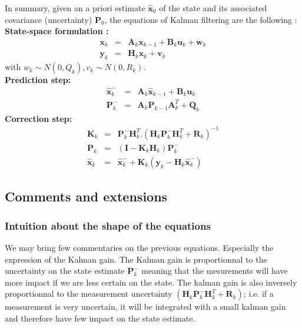 \documentclass[10pt,oneside]{scrartcl}
\newcommand\vecteur[1]{\boldsymbol#1}
\newcommand\matrice[1]{\mathbf#1}
\begin{document}
In summary, given an a priori estimate $\hat{\vecteur{x}}_0$ of the state and its associated covariance (uncertainty) $\matrice{P}_0$, the equations of Kalman filtering are the following :\\
\textbf{State-space formulation :}\\
\begin{eqnarray}
\vecteur{x_k} &=& \matrice{A}_k \vecteur{x}_{k-1} + \matrice{B}_k
\vecteur{u}_k + \vecteur{w}_{k}\\
\vecteur{y_k} &=& \matrice{H}_k \vecteur{x_k} + \vecteur{v_k}
\end{eqnarray}
with $w_k\sim N(0,Q_k), v_k \sim N(0,R_k)$.\\
\textbf{Prediction step:}\\
\begin{eqnarray}
\hat{\vecteur{x}}^-_k &=& \matrice{A}_k \hat{\vecteur{x}}_{k-1} + \matrice{B}_k
\vecteur{u}_k \\
\matrice{P^-_k} &=& \matrice{A}_k \matrice{P_{k-1}} \matrice{A}_k^T + \matrice{Q_k}
\end{eqnarray}
\textbf{Correction step:}\\
\begin{eqnarray}
\matrice{K_k} &=& \matrice{P^-_k} \matrice{H}_k^T . (\matrice{H}_k \matrice{P^-_k} \matrice{H}_k^T +\matrice{R_k})^{-1}\\
\matrice{P_k} &=& (\matrice{I} - \matrice{K_k} \matrice{H}_k) \matrice{P^-_k}\\
\hat{\vecteur{x}}_k &=& \hat{\vecteur{x}}^-_k + \matrice{K_k} (\vecteur{y_k} - \matrice{H}_k \hat{\vecteur{x}}_k^-)
\end{eqnarray}

\subsection{Comments and extensions}

\subsubsection{Intuition about the shape of the equations}

We may bring few commentaries on the previous equations. Especially
the expression of the Kalman gain. The Kalman gain is proportionnal to
the uncertainty on the state estimate $\matrice{P}_k^-$ meaning that
the mesurements will have more impact if we are less certain on the
state. The kalman gain is also inversely proportionnal to the
measurement uncertainty $(\matrice{H}_k \matrice{P^-_k} \matrice{H}_k^T
+\matrice{R_k})$; i.e. if a measurement is very uncertain, it will be
integrated with a small kalman gain and therefore have few impact on
the state estimate.\\
\end{document}

